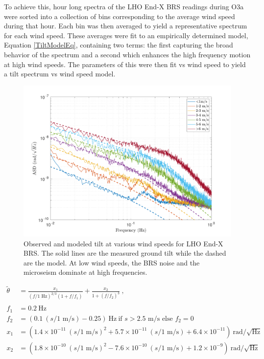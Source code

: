 \documentclass [12pt, proquest]{uwthesis}[2019]
\begin{document}
To achieve this, hour long spectra of the LHO End-X BRS readings during O3a were sorted into a collection of bins corresponding to the average wind speed during that hour. Each bin was then averaged to yield a representative spectrum for each wind speed. These averages were fit to an empirically determined model, Equation \ref{TiltModelEq}, containing two terms: the first capturing the broad behavior of the spectrum and a second which enhances the high frequency motion at high wind speeds. The parameters of this were then fit vs wind speed to yield a tilt spectrum vs wind speed model. 

\begin{figure}[!h]
\begin{center}
\includegraphics[width=\textwidth]{TiltModel.pdf}
\caption[Observed and modeled tilt vs wind speed]{Observed and modeled tilt at various wind speeds for LHO End-X BRS. The solid lines are the measured ground tilt while the dashed are the model. At low wind speeds, the BRS noise and the microseism dominate at high frequencies.}
\label{tiltModel}
\end{center}
\end{figure}

\begin{align}
\tilde{\theta}&=\frac{x_1}{(f/1\text{ Hz})^{2/3}(1+f/f_1)} +\frac{x_2}{1+(f/f_2)^3}\ ,\label{TiltModelEq}\\
\nonumber \\ 
f_1&=0.2\ \text{Hz}\nonumber \\
f_2&=(0.1\ (s/\text{1 m/s}) -0.25)\ \text{Hz}\ \text{if }s>2.5\text{ m/s}\text{ else }f_2=0\nonumber \\
x_1&=(1.4\times10^{-11}\ (s/\text{1 m/s})^2+5.7\times10^{-11}\ (s/\text{1 m/s})+6.4\times10^{-11})\ \text{rad}/\sqrt{\text{Hz}}\nonumber \\
x_2&=(1.8\times10^{-10}\ (s/\text{1 m/s})^2-7.6\times10^{-10}\ (s/\text{1 m/s})+1.2\times10^{-9})\ \text{rad}/\sqrt{\text{Hz}}\nonumber
\end{align}
\end{document}
